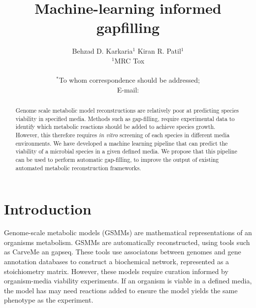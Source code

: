 \documentclass[11pt,a4paper]{article}
\begin{document}
\title{Machine-learning informed gapfilling}
\author{Behzad D. Karkaria$^{1}$ Kiran R. Patil$^{1}$\\
\normalsize{$^{1}$MRC Tox}\\
\\
\normalsize{$^\ast$To whom correspondence should be addressed;}\\
\normalsize{E-mail: }
}
\date{}

\maketitle
\begin{abstract}
    Genome scale metabolic model reconstructions are relatively poor at predicting species viability in specified media. Methods such as gap-filling, require experimental data to identify which metabolic reactions should be added to achieve species growth. However, this therefore requires \textit{in vitro} screening of each species in different media environments. We have developed a machine learning pipeline that can predict the viability of a microbial species in a given defined media. We propose that this pipeline can be used to perform automatic gap-filling, to improve the output of existing automated metabolic reconstruction frameworks.
\end{abstract}

\section{Introduction}
Genome-scale metabolic models (GSMMs) are mathematical representations of an organisms metabolism. GSMMs are automatically reconstructed, using tools such as CarveMe an gapseq. These tools use associatons between genomes and gene annotation databases to construct a biochemical network, represented as a stoichiometry matrix. However, these models require curation informed by organism-media viability experiments. If an organism is viable in a defined media, the model has may need reactions added to ensure the model yields the same phenotype as the experiment.
\end{document}
